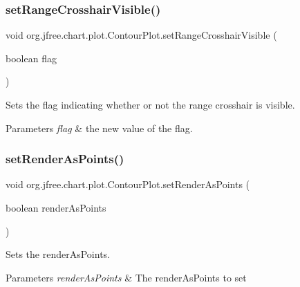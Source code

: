 \subsubsection{\texorpdfstring{set\+Range\+Crosshair\+Visible()}{setRangeCrosshairVisible()}}
{\footnotesize\ttfamily void org.\+jfree.\+chart.\+plot.\+Contour\+Plot.\+set\+Range\+Crosshair\+Visible (\begin{DoxyParamCaption}\item[{boolean}]{flag }\end{DoxyParamCaption})}

Sets the flag indicating whether or not the range crosshair is visible.


\begin{DoxyParams}{Parameters}
{\em flag} & the new value of the flag. \\
\hline
\end{DoxyParams}
\mbox{\label{classorg_1_1jfree_1_1chart_1_1plot_1_1_contour_plot_abef714fa820d1eb741694ae585e08e7f}} 
\subsubsection{\texorpdfstring{set\+Render\+As\+Points()}{setRenderAsPoints()}}
{\footnotesize\ttfamily void org.\+jfree.\+chart.\+plot.\+Contour\+Plot.\+set\+Render\+As\+Points (\begin{DoxyParamCaption}\item[{boolean}]{render\+As\+Points }\end{DoxyParamCaption})}

Sets the render\+As\+Points. 
\begin{DoxyParams}{Parameters}
{\em render\+As\+Points} & The render\+As\+Points to set \\
\hline
\end{DoxyParams}
\mbox{\label{classorg_1_1jfree_1_1chart_1_1plot_1_1_contour_plot_afb3f6aeba081e0b5df934587c120edb5}} 
